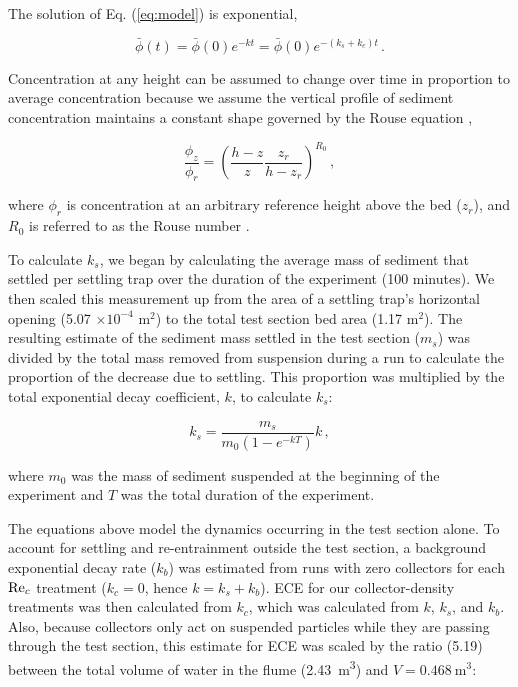 \documentclass[geosciences,article,submit,moreauthors,pdftex]{Definitions/mdpi}
\begin{document}
The solution of Eq. (\ref{eq:model}) is exponential,

\begin{equation}
    \bar{\phi}(t) = \bar{\phi}(0)e^{-kt} = \bar{\phi}(0)e^{-(k_s + k_c)t}\,.
    \label{eq:expo}    
\end{equation}

\noindent Concentration at any height can be assumed to change over time in proportion to average concentration because we assume the vertical profile of sediment concentration maintains a constant shape governed by the Rouse equation \cite{rouse1937modern},

\begin{equation}
    \frac{\phi_z}{\phi_r} = \left( \frac{h - z}{z} \frac{z_r}{h - z_r} \right)^{R_0}\,,
    \label{eq:rouse}    
\end{equation}

\noindent where $\phi_r$ is concentration at an arbitrary reference height above the bed ($z_r$), and $R_0$ is referred to as the Rouse number \cite{kumbhakar2017derivation}.

To calculate $k_s$, we began by calculating the average mass of sediment that settled per settling trap over the duration of the experiment (100 minutes). We then scaled this measurement up from the area of a settling trap's horizontal opening (5.07 $\times 10^{-4}$ m$^2$) to the total test section bed area (1.17 m$^2$). The resulting estimate of the sediment mass settled in the test section ($m_s$) was divided by the total mass removed from suspension during a run to calculate the proportion of the decrease due to settling. This proportion was multiplied by the total exponential decay coefficient, $k$, to calculate $k_s$:

\begin{equation}
    k_s = \frac{m_s}{m_0(1-e^{-kT})}k\,,
    \label{eq:ks}
\end{equation}

\noindent where $m_0$ was the mass of sediment suspended at the beginning of the experiment and $T$ was the total duration of the experiment.

The equations above model the dynamics occurring in the test section alone. To account for settling and re-entrainment outside the test section, a background exponential decay rate ($k_b$) was estimated from runs with zero collectors for each $\mathrm{Re}_c$ treatment ($k_c = 0$, hence $k = k_s + k_b$). ECE for our collector-density treatments was then calculated from $k_c$, which was calculated from $k$, $k_s$, and $k_b$. Also, because collectors only act on suspended particles while they are passing through the test section, this estimate for ECE was scaled by the ratio (5.19) between the total volume of water in the flume (\SI{2.43}{\metre\cubed}) and $V = \SI{0.468}{\metre\cubed}$:
\end{document}
